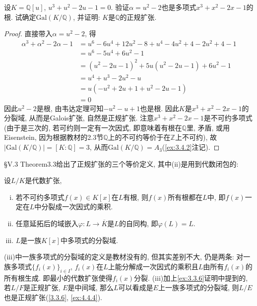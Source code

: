 \begin{problem}\label{ex:3.3.10}
    设$K = \mathbb{Q}[u]$, $u^3 + u^2 - 2u - 1 = 0$. 验证$\alpha = u^2 - 2$也是多项式$x^3 + x^2 - 2x - 1$的根. 试确定$\mathrm{Gal}(K/\mathbb{Q})$, 并证明: $K$是$\mathbb{Q}$的正规扩张.
\end{problem}

\begin{proof}
    直接带入$\alpha = u^2 - 2$, 得
    \[
    \begin{aligned}
        \alpha^3 + \alpha^2 - 2\alpha - 1 &= u^6 - 6u^4 + 12u^2 - 8 + u^4 - 4u^2 + 4 - 2u^2 + 4 - 1\\
        &= u^6 - 5u^4 + 6u^2 - 1\\
        &= (u^2 - 2u - 1)^2 + 5u(u^2 - 2u - 1) + 6u^2 - 1\\
        &= u^4 + u^3 - 2u^2 - u\\
        &= u(-u^2 + 2u + 1 + u^2 - 2u - 1)\\
        &= 0
    \end{aligned} 
    \]
    因此$u^2 - 2$是根, 由韦达定理可知$-u^2 - u + 1$也是根. 因此$K$是$x^3 + x^2 - 2x - 1$的分裂域, 从而是Galois扩张, 自然是正规扩张. 注意$x^3 + x^2 - 2x - 1$是不可约多项式(由于是三次的, 若可约则一定有一次因式, 即意味着有根在$\mathbb{Q}$里, 矛盾, 或用Eisenstein, 因为根据教材的2.3节$\mathbb{Q}$上的不可约等价于在$\mathbb{Z}$上不可约), 故$|\mathrm{Gal}(K/\mathbb{Q})| = [K:\mathbb{Q}] = 3$, 从而$\mathrm{Gal}(K/\mathbb{Q}) = A_3$(\ref{ex:3.4.2}注记).
\end{proof}

\begin{remark}
    \cite{lang2012algebra}\S V.3 Theorem3.3给出了正规扩张的三个等价定义, 其中(ii)是用到代数闭包的:

    设$L/K$是代数扩张,
    \begin{enumerate}[(i)]
        \item 若不可约多项式$f(x) \in K[x]$在$L$有根, 则$f(x)$所有根都在$L$中, 即$f(x)$一定在$L$中分裂成一次因式的乘积.
        \item 任意延拓后的域嵌入$\varphi:L \to \overline{K}$是$L$的自同构, 即$\varphi(L) = L$.
        \item $L$是一族$K[x]$中多项式的分裂域.
    \end{enumerate}

    (iii)中一族多项式的分裂域的定义是教材没有的, 但其实差别不大, 仍是两条: 对一族多项式$\{f_i(x)\}_{i \in I}$, $f_i(x)$在$L$上能分解成一次因式的乘积且$L$由所有$f_i(x)$的所有根生成. 即最小的代数扩张使得$f_i(x)$分裂. (iii)加上\ref{ex:3.3.6}证明中提到的, 若$L/F$是正规扩张, $E$是中间域, 那么$L$可以看成是$E$上一族多项式的分裂域, 则$L/E$也是正规扩张(\ref{3.3.6}, \ref{ex:4.4.4}).
\end{remark}

